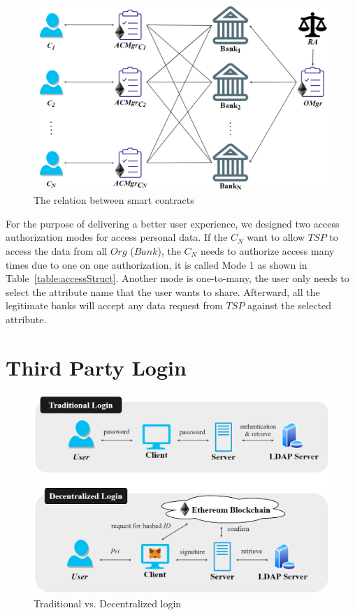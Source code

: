 \begin{figure}[htb]
    \centering
    \includegraphics[height=!,width=0.8\linewidth,keepaspectratio=true]{figures/smart_contract_deployment.png}
    \caption{{\footnotesize The relation between smart contracts}}
    \label{fig:smart_contract_deployment}
\end{figure}
For the purpose of delivering a better user experience, we designed two access authorization modes for access personal data. If the \(C_N\) want to allow \(TSP\) to access the data from all \(Org\) ($Bank$), the \(C_N\) needs to authorize access many times due to one on one authorization, it is called Mode 1 as shown in Table~\ref{table:accessStruct}. Another mode is one-to-many, the user only needs to select the attribute name that the user wants to share. Afterward, all the legitimate banks will accept any data request from \(TSP\)  against the selected attribute.


\newpage

\section{Third Party Login}

\begin{figure}[htb]
    \centering
    \includegraphics[height=!,width=1\linewidth,keepaspectratio=true]{figures/traditional_decentralized.png}
    \caption{{\footnotesize Traditional vs. Decentralized login}}
    \label{fig:traditional_decentralized}
\end{figure}

